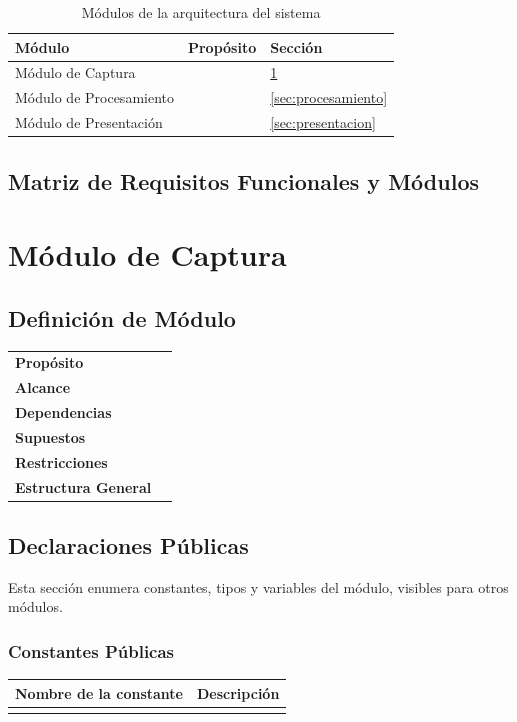 \documentclass[a4paper,10pt]{article}
\begin{document}
\begin{table}[h]
        \centering
        \begin{tabular}{|p{3cm}|l|p{15mm}|}
                \hline
                \textbf{Módulo} & \textbf{Propósito} & \textbf{Sección} \\
                \hline
                Módulo de Captura & &\ref{sec:captura} \\
                \hline
                Módulo de Procesamiento & &\ref{sec:procesamiento}\\
                \hline
                Módulo de Presentación & &\ref{sec:presentacion}\\
                \hline
        \end{tabular}
        \caption{Módulos de la arquitectura del sistema}
        \label{tab:modulos}
\end{table}
\subsection{Matriz de Requisitos Funcionales y Módulos}

\section{Módulo de Captura}
\label{sec:captura}
\subsection{Definición de Módulo}
\begin{tabular}{p{2cm} l}
        \textbf{Propósito} & \\
        \textbf{Alcance} & \\
        \textbf{Dependencias} & \\
        \textbf{Supuestos} & \\
        \textbf{Restricciones} & \\
        \textbf{Estructura General} & \\
\end{tabular}
\subsection{Declaraciones Públicas}
Esta sección enumera constantes, tipos y variables del módulo, visibles para
otros módulos.
\subsubsection{Constantes Públicas}
\begin{tabular}{| p{30mm} | p{10cm} |}
        \hline
        \textbf{Nombre de la \mbox{constante}} & \textbf{Descripción} \\
        \hline
         & \\
        \hline
\end{tabular}
                
\end{document}
